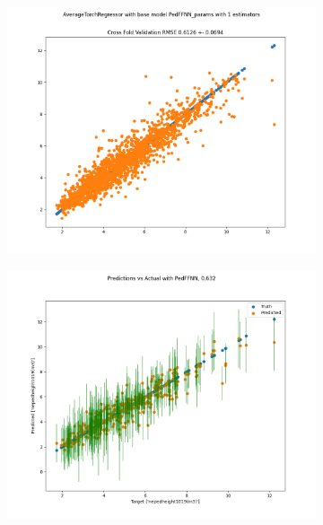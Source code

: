 \documentclass[a4paper, twoside, final, 12pt]{article}
\begin{document}
{\begin{figure}
	\begin{subfigure}{0.49\linewidth}
		\centering 
		\includegraphics[scale=0.3]{./src/ANN_1}
		\caption{}
		\label{subfig:ann_1}
	\end{subfigure}
	\begin{subfigure}{0.5\linewidth}
		\centering
		\includegraphics[scale=0.3]{./src/ENSEMBLE_5}
		\caption{}
		\label{subfig:ensemble}
	\end{subfigure}
\end{figure}

}
\end{document}
